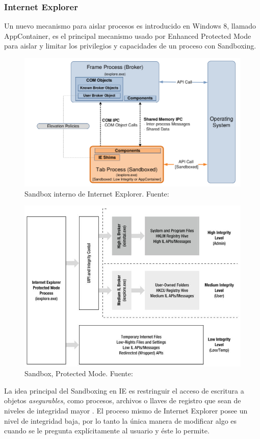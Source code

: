     \subsubsection{Internet Explorer}
        Un nuevo mecanismo para aislar procesos es introducido en Windows 8, llamado AppContainer, es el principal mecanismo usado por Enhanced Protected Mode para aislar y limitar los privilegios y capacidades de un proceso con Sandboxing.
        \begin{figure}[h!t]
            \centering
            \includegraphics[scale=0.5]{figures/sandboxIE.png}
            \caption{Sandbox interno de Internet Explorer. Fuente: \cite{Yason}}
            \label{fig:SandboxIE}
        \end{figure}

        \begin{figure}[h!t]
            \centering
            \includegraphics[scale=0.5]{figures/IEProtectedMode.jpg}
            \caption{Sandbox, Protected Mode. Fuente: \cite{Crowley2010}}
            \label{fig:SandboxIE2}
        \end{figure}
        La idea principal del Sandboxing en IE es restringuir el acceso de escritura a objetos \textit{asegurables}, como procesos, archivos o llaves de registro que sean de niveles de integridad mayor \cite{Colvin2010}. El proceso mismo de Internet Explorer posee un nivel de integridad baja, por lo tanto la única manera de modificar algo es cuando se le pregunta explícitamente al usuario y éste lo permite.



